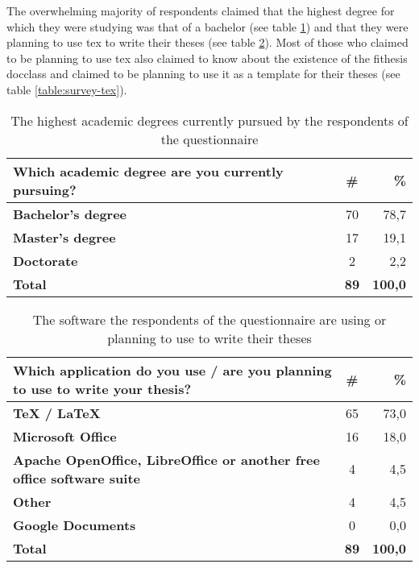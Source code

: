   The overwhelming majority of respondents claimed that the highest degree for which they were studying was that of a bachelor (see table \ref{table:survey-type}) and that they were planning to use \gls{tex} to write their theses (see table \ref{table:survey-sw}). Most of those who claimed to be planning to use \gls{tex} also claimed to know about the existence of the fithesis \gls{docclass} and claimed to be planning to use it as a template for their theses (see table \ref{table:survey-tex}).

  \begin{table}
    \begin{tabularx}{\textwidth}{Xcr}
      \textbf{Which academic degree are you currently pursuing?} & \textbf{\#} & \textbf{\%} \\
      \hline
      \textbf{Bachelor's degree}            & 70          & 78,7 \\
      \textbf{Master's degree}              & 17          & 19,1 \\
      \textbf{Doctorate}                    & 2           & 2,2  \\
      \hline
      \textbf{Total}                        & \textbf{89} & \textbf{100,0}
    \end{tabularx}
    \caption{The highest academic degrees currently pursued by the respondents of the questionnaire}
    \label{table:survey-type}
  \end{table}

  \begin{table}
    \begin{tabularx}{\textwidth}{Xcr}
      \textbf{Which application do you use / are you planning to use to write your thesis?} & \textbf{\#} & \textbf{\%} \\
      \hline
      \textbf{\TeX{} / \LaTeX{}}            & 65          & 73,0 \\
      \textbf{Microsoft Office}             & 16          & 18,0 \\
      \textbf{Apache OpenOffice, LibreOffice
              or another free office
              software suite}               & 4           &  4,5 \\
      \textbf{Other}                        & 4           &  4,5 \\
      \textbf{Google Documents}             & 0           &  0,0 \\
      \hline
      \textbf{Total}                        & \textbf{89} & \textbf{100,0}
    \end{tabularx}
    \caption{The software the respondents of the questionnaire are using or planning to use to write their theses}
    \label{table:survey-sw}
  \end{table}

